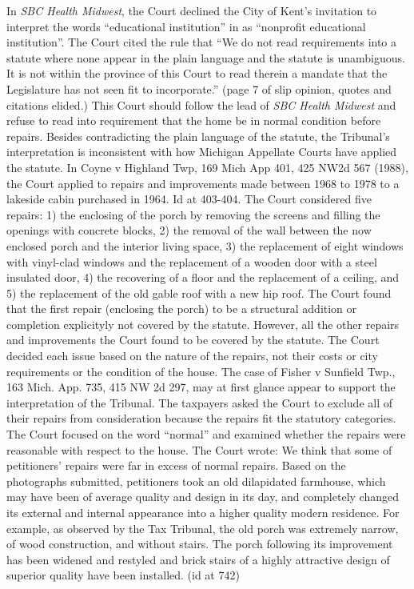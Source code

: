 \documentclass[12pt,\documentclassflag]{michiganCourtOfAppealsBrief}
\begin{document}
In \textit{SBC Health Midwest}, the Court declined the City of Kent's invitation to interpret the words ``educational institution'' in  as ``nonprofit educational institution''. The Court cited the rule that ``We do not read requirements into a statute where none appear in the plain language and the statute is unambiguous. It is not within the province of this Court to read therein a mandate that the Legislature has not seen fit to incorporate.'' (page 7 of slip opinion, quotes and citations elided.) This Court should follow the lead of \textit{SBC Health Midwest} and refuse to read into  requirement that the home be in normal condition before repairs.
Besides contradicting the plain language of the statute, the Tribunal's interpretation is inconsistent with how Michigan Appellate Courts have applied the statute. In Coyne v Highland Twp, 169 Mich App 401, 425 NW2d 567 (1988), the Court applied  to repairs and improvements made between 1968 to 1978 to a lakeside cabin purchased in 1964. Id at 403-404. The Court considered five repairs: 1) the enclosing of the porch by removing the screens and filling the openings with concrete blocks, 2) the removal of the wall between the now enclosed porch and the interior living space, 3) the replacement of eight windows with vinyl-clad windows and the replacement of a wooden door with a steel insulated door, 4) the recovering of a floor and the replacement of a ceiling, and 5) the replacement of the old gable roof with a new hip roof. The Court found that the first repair (enclosing the porch) to be a structural addition or completion explicityly not covered by the statute. However, all the other repairs and improvements the Court found to be covered by the statute. The Court decided each issue based on the nature of the repairs, not their costs or city requirements or the condition of the house. 
The case of Fisher v Sunfield Twp., 163 Mich. App. 735, 415 NW 2d 297, may at first glance appear to support the interpretation of the Tribunal. The taxpayers asked the Court to exclude all of their repairs from consideration because the repairs fit the statutory categories. The Court focused on the word ``normal'' and examined whether the repairs were reasonable with respect to the house. The Court wrote: 
We think that some of petitioners' repairs were far in excess of normal repairs. Based on the photographs submitted, petitioners took an old dilapidated farmhouse, which may have been of average quality and design in its day, and completely changed its external and internal appearance into a higher quality modern residence. For example, as observed by the Tax Tribunal, the old porch was extremely narrow, of wood construction, and without stairs. The porch following its improvement has been widened and restyled and brick stairs of a highly attractive design of superior quality have been installed. (id at 742)
 
\end{document}
